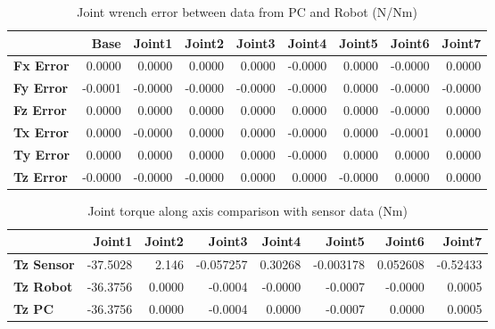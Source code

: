 \begin{table}[h!]
	\centering
	\caption{Joint wrench error between data from PC and Robot (N/Nm)}
	\label{wrech_Error_Pose15}
	\begin{tabular}{|l|r|r|r|r|r|r|r|r|}
		\hline
		\textbf{}  & \textbf{Base} & \textbf{Joint1}  & \textbf{Joint2}  & \textbf{Joint3}  & \textbf{Joint4}  & \textbf{Joint5}  & \textbf{Joint6}  & \textbf{Joint7} \\ \hline
		\textbf{Fx Error}  & 0.0000        & 0.0000        & 0.0000        & 0.0000        & -0.0000        & 0.0000        & -0.0000        & 0.0000 \\ \hline
		\textbf{Fy Error}  & -0.0001        & -0.0000        & -0.0000        & -0.0000        & -0.0000        & 0.0000        & -0.0000        & -0.0000 \\ \hline
		\textbf{Fz Error}  & 0.0000        & 0.0000        & 0.0000        & 0.0000        & 0.0000        & 0.0000        & -0.0000        & 0.0000 \\ \hline
		\textbf{Tx Error}  & 0.0000        & -0.0000        & 0.0000        & 0.0000        & -0.0000        & 0.0000        & -0.0001        & 0.0000 \\ \hline
		\textbf{Ty Error}  & 0.0000        & 0.0000        & 0.0000        & 0.0000        & -0.0000        & 0.0000        & 0.0000        & 0.0000 \\ \hline
		\textbf{Tz Error}  & -0.0000        & -0.0000        & -0.0000        & 0.0000        & 0.0000        & -0.0000        & 0.0000        & 0.0000 \\ \hline
	\end{tabular}
\end{table}

\begin{table}[h!]
	\centering
	\caption{Joint torque along axis comparison with sensor data (Nm)}
	\label{wrech_Sensor_Pose15}
	\begin{tabular}{|l|r|r|r|r|r|r|r|}
		\hline
		\textbf{} & \textbf{Joint1} & \textbf{Joint2} & \textbf{Joint3} & \textbf{Joint4} & \textbf{Joint5} & \textbf{Joint6} & \textbf{Joint7} \\ \hline
		\textbf{Tz Sensor}  & -37.5028           & 2.146           & -0.057257            & 0.30268           & -0.003178           & 0.052608           & -0.52433           \\ \hline
		\textbf{Tz Robot}  	& -36.3756           & 0.0000           & -0.0004            & -0.0000           & -0.0007           & -0.0000           & 0.0005           \\ \hline
		\textbf{Tz PC}  	& -36.3756           & 0.0000           & -0.0004            & 0.0000           & -0.0007           & 0.0000           & 0.0005           \\ \hline
	\end{tabular}
\end{table}

